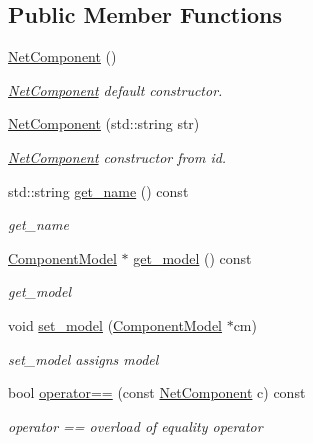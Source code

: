 \subsection*{Public Member Functions}
\begin{DoxyCompactItemize}
\item 
\hyperlink{class_net_component_a77dc2a06629c0cbbe1b2ce1c33ae34f7}{Net\+Component} ()\hypertarget{class_net_component_a77dc2a06629c0cbbe1b2ce1c33ae34f7}{}\label{class_net_component_a77dc2a06629c0cbbe1b2ce1c33ae34f7}

\begin{DoxyCompactList}\small\item\em \hyperlink{class_net_component}{Net\+Component} default constructor. \end{DoxyCompactList}\item 
\hyperlink{class_net_component_aa1b768bd499286c1ee62202d5fe36e7c}{Net\+Component} (std\+::string str)
\begin{DoxyCompactList}\small\item\em \hyperlink{class_net_component}{Net\+Component} constructor from id. \end{DoxyCompactList}\item 
std\+::string \hyperlink{class_net_component_a04ae33a17be08247e96bee14775d31e6}{get\+\_\+name} () const 
\begin{DoxyCompactList}\small\item\em get\+\_\+name \end{DoxyCompactList}\item 
\hyperlink{class_component_model}{Component\+Model} $\ast$ \hyperlink{class_net_component_a94adff8ef99b5283f7768f13e54c538a}{get\+\_\+model} () const 
\begin{DoxyCompactList}\small\item\em get\+\_\+model \end{DoxyCompactList}\item 
void \hyperlink{class_net_component_a82a52610414f1913eb4711d5ad63f66c}{set\+\_\+model} (\hyperlink{class_component_model}{Component\+Model} $\ast$cm)
\begin{DoxyCompactList}\small\item\em set\+\_\+model assigns model \end{DoxyCompactList}\item 
bool \hyperlink{class_net_component_ad810dbc0fc141639e872ca7526d29b0e}{operator==} (const \hyperlink{class_net_component}{Net\+Component} c) const 
\begin{DoxyCompactList}\small\item\em operator == overload of equality operator \end{DoxyCompactList}\end{DoxyCompactItemize}
